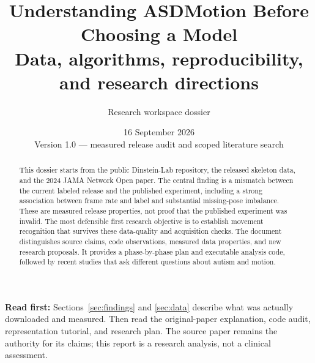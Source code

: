 \documentclass[11pt,a4paper]{article}
\title{Understanding ASDMotion Before Choosing a Model\\\large Data, algorithms, reproducibility, and research directions}
\author{Research workspace dossier}
\date{16 September 2026\\Version 1.0 --- measured release audit and scoped literature search}
\begin{document}
\maketitle
\begin{abstract}
This dossier starts from the public Dinstein-Lab repository, the released skeleton data, and the 2024 JAMA Network Open paper. The central finding is a mismatch between the current labeled release and the published experiment, including a strong association between frame rate and label and substantial missing-pose imbalance. These are measured release properties, not proof that the published experiment was invalid. The most defensible first research objective is to establish movement recognition that survives these data-quality and acquisition checks. The document distinguishes source claims, code observations, measured data properties, and new research proposals. It provides a phase-by-phase plan and executable analysis code, followed by recent studies that ask different questions about autism and motion.
\end{abstract}
\textbf{Read first:} Sections~\ref{sec:findings} and \ref{sec:data} describe what was actually downloaded and measured. Then read the original-paper explanation, code audit, representation tutorial, and research plan. The source paper remains the authority for its claims; this report is a research analysis, not a clinical assessment.
\begingroup\small\tableofcontents\endgroup
\clearpage
\end{document}
